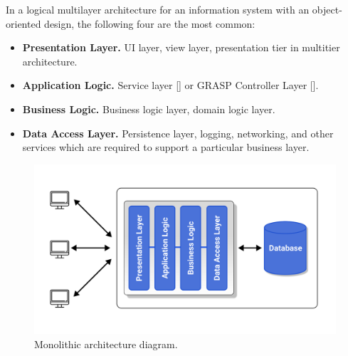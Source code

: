 In a logical multilayer architecture for an information system with an object-oriented design, the following four are the most common:

\begin{itemize} %
    \item \textbf{Presentation Layer.} UI layer, view layer, presentation tier in multitier architecture.
    \item \textbf{Application Logic.} Service layer [\cite{ji2009intelligent, swetina2014toward}]
    or GRASP Controller Layer [\cite{okada2006vision}].
    \item \textbf{Business Logic.} Business logic layer, domain logic layer.
    \item \textbf{Data Access Layer.} Persistence layer, logging, networking, and other services which are required
    to support a particular business layer.
\end{itemize}

\begin{figure}[H]
    \centering
    \includegraphics[width=1\textwidth]{Pictures/Monolith_architecture.pdf}
    \caption{Monolithic architecture diagram.}\label{fig:figure2}
\end{figure}

